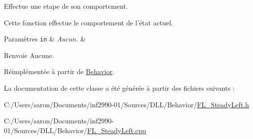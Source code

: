 Effectue une etape de son comportement. 

Cette fonction effectue le comportement de l'état actuel.


\begin{DoxyParams}[1]{Paramètres}
\mbox{\tt in}  & {\em Aucun.} & \\
\hline
\end{DoxyParams}
\begin{DoxyReturn}{Renvoie}
Aucune. 
\end{DoxyReturn}


Réimplémentée à partir de \hyperlink{group__inf2990_gac22f205bc85075ff707ad1f695c18439}{Behavior}.



La documentation de cette classe a été générée à partir des fichiers suivants \-:\begin{DoxyCompactItemize}
\item 
C\-:/\-Users/saron/\-Documents/inf2990-\/01/\-Sources/\-D\-L\-L/\-Behavior/\hyperlink{_f_l___steady_left_8h}{F\-L\-\_\-\-Steady\-Left.\-h}\item 
C\-:/\-Users/saron/\-Documents/inf2990-\/01/\-Sources/\-D\-L\-L/\-Behavior/\hyperlink{_f_l___steady_left_8cpp}{F\-L\-\_\-\-Steady\-Left.\-cpp}\end{DoxyCompactItemize}
